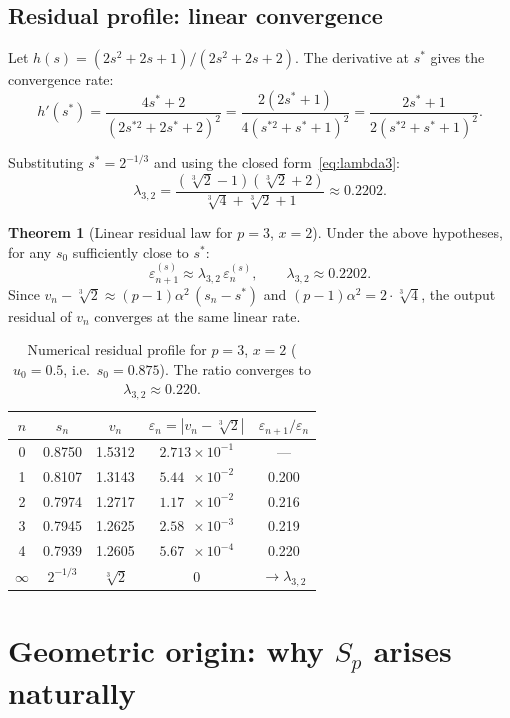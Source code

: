 \documentclass[11pt,a4paper]{article}
\theoremstyle{definition}
\newtheorem{theorem}{Theorem}[section]
\newcommand{\cbrt}[1]{\sqrt[3]{#1}}
\newcommand{\eps}{\varepsilon}
\begin{document}
\subsection{Residual profile: linear convergence}

Let $h(s) = (2s^2 + 2s + 1)/(2s^2 + 2s + 2)$. The derivative at $s^*$ gives the convergence rate:
\[
  h'(s^*) = \frac{4s^* + 2}{(2s^{*2} + 2s^* + 2)^2} = \frac{2(2s^*+1)}{4(s^{*2}+s^*+1)^2} = \frac{2s^*+1}{2(s^{*2}+s^*+1)^2}.
\]

Substituting $s^* = 2^{-1/3}$ and using the closed form~\eqref{eq:lambda3}:
\[
  \lambda_{3,2} = \frac{(\cbrt{2}-1)(\cbrt{2}+2)}{\cbrt{4}+\cbrt{2}+1} \approx 0.2202.
\]

\begin{theorem}[Linear residual law for $p=3$, $x=2$]
Under the above hypotheses, for any $s_0$ sufficiently close to $s^*$:
\[
  \eps_{n+1}^{(s)} \approx \lambda_{3,2}\,\eps_n^{(s)}, \qquad \lambda_{3,2} \approx 0.2202.
\]
Since $v_n - \cbrt{2} \approx (p-1)\alpha^2\,(s_n - s^*)$ and $(p-1)\alpha^2 = 2 \cdot \cbrt{4}$, the output residual of $v_n$ converges at the same linear rate.
\end{theorem}

\begin{table}[h]
\centering
\begin{tabular}{ccccc}
\toprule
$n$ & $s_n$ & $v_n$ & $\eps_n = |v_n - \cbrt{2}|$ & $\eps_{n+1}/\eps_n$ \\
\midrule
0 & 0.8750 & 1.5312 & $2.713 \times 10^{-1}$ & --- \\
1 & 0.8107 & 1.3143 & $5.44\phantom{0} \times 10^{-2}$ & 0.200 \\
2 & 0.7974 & 1.2717 & $1.17\phantom{0} \times 10^{-2}$ & 0.216 \\
3 & 0.7945 & 1.2625 & $2.58\phantom{0} \times 10^{-3}$ & 0.219 \\
4 & 0.7939 & 1.2605 & $5.67\phantom{0} \times 10^{-4}$ & 0.220 \\
$\infty$ & $2^{-1/3}$ & $\cbrt{2}$ & $0$ & $\to \lambda_{3,2}$ \\
\bottomrule
\end{tabular}
\caption{Numerical residual profile for $p=3$, $x=2$ ($u_0 = 0.5$, i.e.\ $s_0 = 0.875$). The ratio converges to $\lambda_{3,2} \approx 0.220$.}
\end{table}

\section{Geometric origin: why $S_p$ arises naturally}
\label{sec:geometrie}
\end{document}
